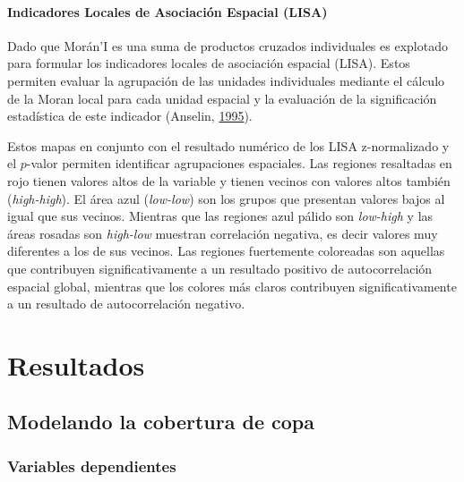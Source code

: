 \documentclass[12pt,a4paper,openany]{book}
\theoremstyle{definition}
\theoremstyle{definition}
\theoremstyle{definition}
\theoremstyle{remark}
\begin{document}
\subsubsection{Indicadores Locales de Asociación Espacial
(LISA)}\label{indicadores-locales-de-asociaciuxf3n-espacial-lisa}

Dado que Morán'I es una suma de productos cruzados individuales es
explotado para formular los indicadores locales de asociación espacial
(LISA). Estos permiten evaluar la agrupación de las unidades
individuales mediante el cálculo de la Moran local para cada unidad
espacial y la evaluación de la significación estadística de este
indicador (Anselin, \protect\hyperlink{ref-anselin1995local}{1995}).

Estos mapas en conjunto con el resultado numérico de los LISA
z-normalizado y el \(p\)-valor permiten identificar agrupaciones
espaciales. Las regiones resaltadas en rojo tienen valores altos de la
variable y tienen vecinos con valores altos también (\emph{high-high}).
El área azul (\emph{low-low}) son los grupos que presentan valores bajos
al igual que sus vecinos. Mientras que las regiones azul pálido son
\emph{low-high} y las áreas rosadas son \emph{high-low} muestran
correlación negativa, es decir valores muy diferentes a los de sus
vecinos. Las regiones fuertemente coloreadas son aquellas que
contribuyen significativamente a un resultado positivo de
autocorrelación espacial global, mientras que los colores más claros
contribuyen significativamente a un resultado de autocorrelación
negativo.

\chapter{Resultados}\label{results}

\section{Modelando la cobertura de
copa}\label{modelando-la-cobertura-de-copa}

\subsection{Variables dependientes}\label{variables-dependientes}
\end{document}
